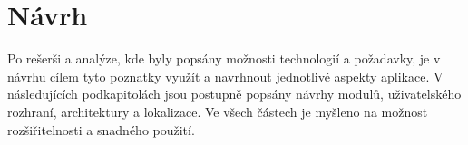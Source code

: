 \chapter{Návrh}
\label{chap:design}

Po rešerši a analýze,
kde byly popsány možnosti technologií a požadavky,
je v návrhu cílem tyto poznatky využít a navrhnout jednotlivé aspekty aplikace.
V následujících podkapitolách jsou postupně popsány návrhy modulů,
uživatelského rozhraní, architektury a lokalizace.
Ve všech částech je myšleno na možnost rozšiřitelnosti a snadného použití.   




